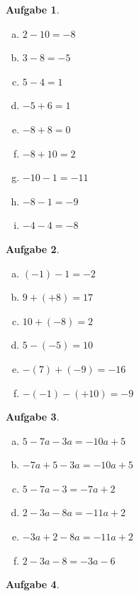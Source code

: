 \documentclass[12pt,fleqn]{article}
\theoremstyle{aufg}
\newtheorem{aufgabe}{Aufgabe}
\theoremstyle{bsp}
\begin{document}
 
    \begin{flushleft}
\begin{aufgabe} ~ \\ 
\begin{multicols}{3} 
\begin{enumerate}[a)] 
\item 
$2-10=-8$
\item 
$3-8=-5$
\item 
$5-4=1$
\item 
$-5+6=1$
\item 
$-8+8=0$
\item 
$-8+10=2$
\item 
$-10-1=-11$
\item 
$-8-1=-9$
\item 
$-4-4=-8$
\end{enumerate} 
\end{multicols} 
\end{aufgabe} 
\begin{aufgabe} ~ \\ 
\begin{multicols}{3} 
\begin{enumerate}[a)] 
\item 
$(-1)-1=-2$
\item 
$9+(+8)=17$
\item 
$10+(-8)=2$
\item 
$5-(-5)=10$
\item 
$-(7)+(-9)=-16$
\item 
$-(-1)-(+10)=-9$
\end{enumerate} 
\end{multicols} 
\end{aufgabe} 
\begin{aufgabe} ~ \\ 
\begin{multicols}{3} 
\begin{enumerate}[a)] 
\item 
$5-7a-3a=- 10 a + 5$
\item 
$-7a+5-3a=- 10 a + 5$
\item 
$5-7a-3=- 7 a + 2$
\item 
$2-3a-8a=- 11 a + 2$
\item 
$-3a+2-8a=- 11 a + 2$
\item 
$2-3a-8=- 3 a - 6$
\end{enumerate} 
\end{multicols} 
\end{aufgabe} 
\begin{aufgabe} ~ \\ 

\end{aufgabe}
\end{flushleft}
\end{document}
